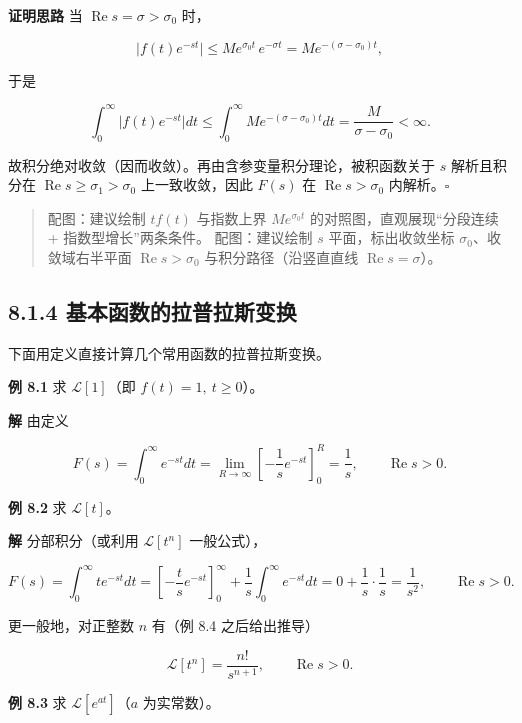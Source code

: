 \textbf{证明思路} 当 \(\operatorname{Re}s=\sigma>\sigma_0\) 时，

\[
\bigl|f(t)e^{-st}\bigr| \le M e^{\sigma_0 t}\,e^{-\sigma t} = M e^{-(\sigma-\sigma_0)t},
\]

于是

\[
\int_0^{\infty}\bigl|f(t)e^{-st}\bigr|dt
\le \int_0^{\infty} M e^{-(\sigma-\sigma_0)t}dt
= \frac{M}{\sigma-\sigma_0} < \infty .
\]

故积分绝对收敛（因而收敛）。再由含参变量积分理论，被积函数关于 \(s\)
解析且积分在 \(\operatorname{Re}s\ge\sigma_1>\sigma_0\) 上一致收敛，因此
\(F(s)\) 在 \(\operatorname{Re}s>\sigma_0\) 内解析。\(\square\)

\begin{quote}
配图：建议绘制 \(t f(t)\) 与指数上界 \(M e^{\sigma_0 t}\)
的对照图，直观展现``分段连续 + 指数型增长''两条条件。 配图：建议绘制
\(s\) 平面，标出收敛坐标 \(\sigma_0\)、收敛域右半平面
\(\operatorname{Re}s>\sigma_0\) 与积分路径（沿竖直直线
\(\operatorname{Re}s=\sigma\)）。
\end{quote}

\subsection{8.1.4
基本函数的拉普拉斯变换}\label{ux57faux672cux51fdux6570ux7684ux62c9ux666eux62c9ux65afux53d8ux6362}

下面用定义直接计算几个常用函数的拉普拉斯变换。

\textbf{例 8.1} 求 \(\mathcal{L}[1]\)（即 \(f(t)=1,\ t\ge 0\)）。

\textbf{解} 由定义

\[
F(s) = \int_0^{\infty} e^{-st}dt
= \lim_{R\to\infty}\left[-\frac{1}{s}e^{-st}\right]_0^{R}
= \frac{1}{s},\qquad \operatorname{Re}s>0 .
\]

\textbf{例 8.2} 求 \(\mathcal{L}[t]\)。

\textbf{解} 分部积分（或利用 \(\mathcal{L}[t^n]\) 一般公式），

\[
F(s)=\int_0^{\infty} t e^{-st}dt
=\left[-\frac{t}{s}e^{-st}\right]_0^{\infty}+\frac{1}{s}\int_0^{\infty}e^{-st}dt
=0+\frac{1}{s}\cdot\frac{1}{s}
=\frac{1}{s^2},\qquad \operatorname{Re}s>0 .
\]

更一般地，对正整数 \(n\) 有（例 8.4 之后给出推导）

\[
\mathcal{L}[t^n]=\frac{n!}{s^{n+1}},\qquad \operatorname{Re}s>0 .
\]

\textbf{例 8.3} 求 \(\mathcal{L}[e^{at}]\)（\(a\) 为实常数）。


